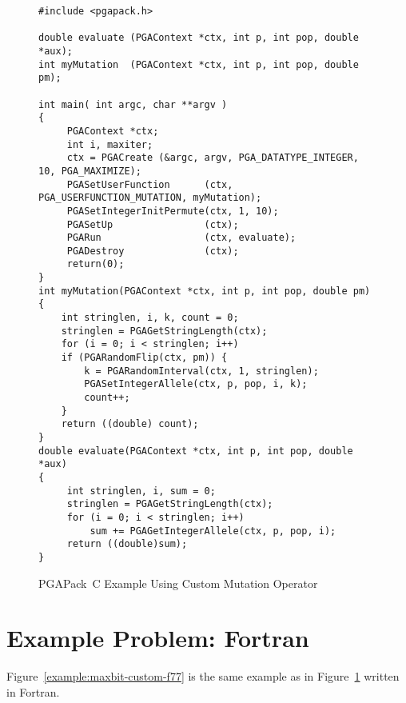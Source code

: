 \documentclass{report}
\newcommand{\pga}{PGAPack}
\begin{document}
\begin{figure}
\begin{verbatim}
#include <pgapack.h>

double evaluate (PGAContext *ctx, int p, int pop, double *aux);
int myMutation  (PGAContext *ctx, int p, int pop, double pm);

int main( int argc, char **argv )
{
     PGAContext *ctx; 
     int i, maxiter;
     ctx = PGACreate (&argc, argv, PGA_DATATYPE_INTEGER, 10, PGA_MAXIMIZE);
     PGASetUserFunction      (ctx, PGA_USERFUNCTION_MUTATION, myMutation);
     PGASetIntegerInitPermute(ctx, 1, 10);
     PGASetUp                (ctx);
     PGARun                  (ctx, evaluate);
     PGADestroy              (ctx);
     return(0);
}
int myMutation(PGAContext *ctx, int p, int pop, double pm)
{
    int stringlen, i, k, count = 0;
    stringlen = PGAGetStringLength(ctx);
    for (i = 0; i < stringlen; i++)
    if (PGARandomFlip(ctx, pm)) {
        k = PGARandomInterval(ctx, 1, stringlen);
        PGASetIntegerAllele(ctx, p, pop, i, k);
        count++;
    }
    return ((double) count);
}
double evaluate(PGAContext *ctx, int p, int pop, double *aux)
{
     int stringlen, i, sum = 0;
     stringlen = PGAGetStringLength(ctx);
     for (i = 0; i < stringlen; i++)
         sum += PGAGetIntegerAllele(ctx, p, pop, i);
     return ((double)sum);
}
\end{verbatim}
\caption{\pga\ C Example Using Custom Mutation Operator}
\label{example:maxbit-custom}
\end{figure}

\section{Example Problem: Fortran}

Figure~\ref{example:maxbit-custom-f77} is the same example as in 
Figure~\ref{example:maxbit-custom} written in Fortran.
\end{document}
